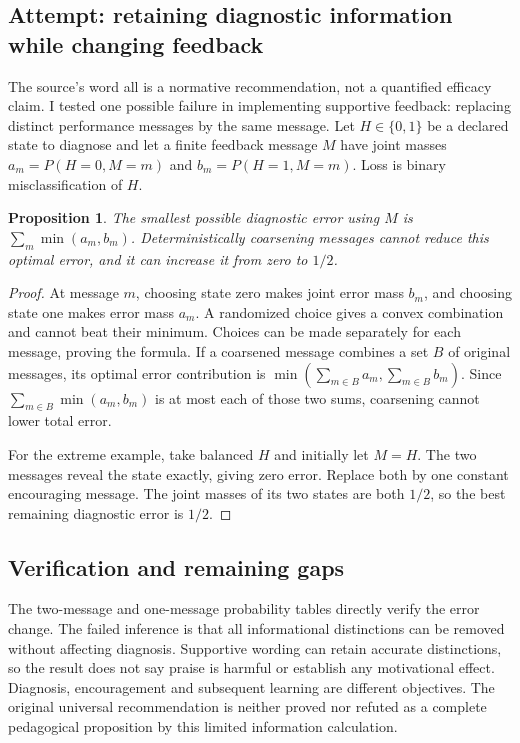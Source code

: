\documentclass[11pt]{article}
\newtheorem{proposition}{Proposition}
\begin{document}
\subsection{Attempt: retaining diagnostic information while changing feedback}
The source's word all is a normative recommendation, not a quantified efficacy claim. I tested one possible failure in implementing supportive feedback: replacing distinct performance messages by the same message. Let $H\in\{0,1\}$ be a declared state to diagnose and let a finite feedback message $M$ have joint masses $a_m=P(H=0,M=m)$ and $b_m=P(H=1,M=m)$. Loss is binary misclassification of $H$.
\begin{proposition}
The smallest possible diagnostic error using $M$ is $\sum_m\min(a_m,b_m)$. Deterministically coarsening messages cannot reduce this optimal error, and it can increase it from zero to $1/2$.
\end{proposition}
\begin{proof}
At message $m$, choosing state zero makes joint error mass $b_m$, and choosing state one makes error mass $a_m$. A randomized choice gives a convex combination and cannot beat their minimum. Choices can be made separately for each message, proving the formula. If a coarsened message combines a set $B$ of original messages, its optimal error contribution is $\min(\sum_{m\in B}a_m,\sum_{m\in B}b_m)$. Since $\sum_{m\in B}\min(a_m,b_m)$ is at most each of those two sums, coarsening cannot lower total error.

For the extreme example, take balanced $H$ and initially let $M=H$. The two messages reveal the state exactly, giving zero error. Replace both by one constant encouraging message. The joint masses of its two states are both $1/2$, so the best remaining diagnostic error is $1/2$.
\end{proof}
\subsection{Verification and remaining gaps}
The two-message and one-message probability tables directly verify the error change. The failed inference is that all informational distinctions can be removed without affecting diagnosis. Supportive wording can retain accurate distinctions, so the result does not say praise is harmful or establish any motivational effect. Diagnosis, encouragement and subsequent learning are different objectives. The original universal recommendation is neither proved nor refuted as a complete pedagogical proposition by this limited information calculation.
\end{document}
